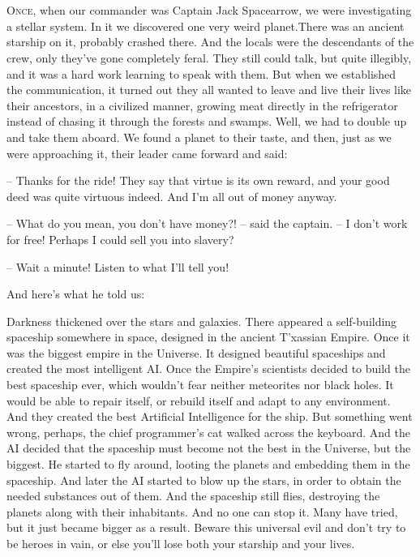 \documentclass[ebook,twoside,final,openright]{memoir}
\begin{document}
\chapter{}
\par
\lettrine{O}{nce,} when our commander was Captain Jack Spacearrow, we were investigating a stellar system. In it we discovered one very weird planet.There was an ancient starship on it, probably crashed there. And the locals were the descendants of the crew, only they’ve gone completely feral. They still could talk, but quite illegibly, and it was a hard work learning to speak with them. But when we established the communication, it turned out they all wanted to leave and live their lives like their ancestors, in a civilized manner, growing meat directly in the refrigerator instead of chasing it through the forests and swamps. Well, we had to double up and take them aboard. We found a planet to their taste, and then, just as we were approaching it, their leader came forward and said: \par
\par
– Thanks for the ride! They say that virtue is its own reward, and your good deed was quite virtuous indeed. And I’m all out of money anyway.\par
– What do you mean, you don’t have money?! – said the captain. – I don’t work for free! Perhaps I could sell you into slavery? \par
– Wait a minute! Listen to what I’ll tell you! \par
 And here’s what he told us:\par
\par
Darkness thickened over the stars and galaxies. There appeared a self-building spaceship somewhere in space, designed in the ancient T'xassian Empire. Once it was the biggest empire in the Universe. It designed beautiful spaceships and created the most intelligent AI. Once the Empire’s scientists decided to build the best spaceship ever, which wouldn’t fear neither meteorites nor black holes. It would be able to repair itself, or rebuild itself and adapt to any environment. And they created the best Artificial Intelligence for the ship. But something went wrong, perhaps, the chief programmer’s cat walked across the keyboard. And the AI decided that the spaceship must become not the best in the Universe, but the biggest. He started to fly around, looting the planets and embedding them in the spaceship. And later the AI started to blow up the stars, in order to obtain the needed substances out of them. And the spaceship still flies, destroying the planets along with their inhabitants. And no one can stop it. Many have tried, but it just became bigger as a result. Beware this universal evil and don’t try to be heroes in vain, or else you’ll lose both your starship and your lives.\par
\end{document}
